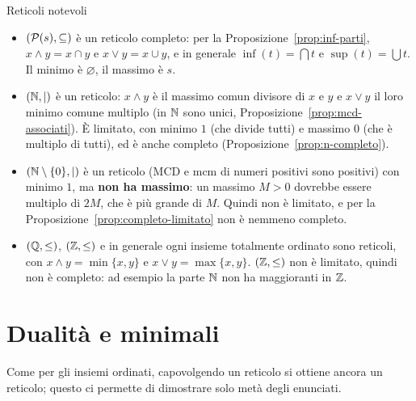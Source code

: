 \begin{esempio}{Reticoli notevoli}
    \begin{itemize}
        \item $(\mathcal{P}(s), \subseteq)$ è un reticolo completo: per la Proposizione~\ref{prop:inf-parti}, $x \wedge y = x \cap y$ e $x \vee y = x \cup y$, e in generale
              $\inf(t) = \bigcap t$ e $\sup(t) = \bigcup t$. Il minimo è $\varnothing$, il massimo è $s$.
        \item $(\mathbb{N}, \mid)$ è un reticolo: $x \wedge y$ è il massimo comun divisore di $x$ e $y$ e $x \vee y$ il loro minimo comune multiplo (in $\mathbb{N}$ sono unici,
              Proposizione~\ref{prop:mcd-associati}). È limitato, con minimo $1$ (che divide tutti) e massimo $0$ (che è multiplo di tutti), ed è anche
              completo (Proposizione~\ref{prop:n-completo}).
        \item $(\mathbb{N} \setminus \{0\}, \mid)$ è un reticolo (MCD e mcm di numeri positivi sono positivi) con minimo $1$, ma \textbf{non ha massimo}: un massimo
              $M > 0$ dovrebbe essere multiplo di $2M$, che è più grande di $M$. Quindi non è limitato, e per la Proposizione~\ref{prop:completo-limitato} non è
              nemmeno completo.
        \item $(\mathbb{Q}, \leq)$, $(\mathbb{Z}, \leq)$ e in generale ogni insieme totalmente ordinato sono reticoli, con $x \wedge y = \min\{x, y\}$ e $x \vee y = \max\{x, y\}$.
              $(\mathbb{Z}, \leq)$ non è limitato, quindi non è completo: ad esempio la parte $\mathbb{N}$ non ha maggioranti in $\mathbb{Z}$.
    \end{itemize}
\end{esempio}


\section{Dualità e minimali}\label{sec:dualita-reticoli}

Come per gli insiemi ordinati, capovolgendo un reticolo si ottiene ancora un reticolo; questo ci permette di dimostrare solo metà
degli enunciati.

